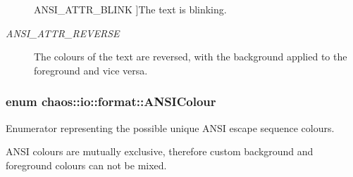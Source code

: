 \begin{Desc}
\begin{description}
{\hypertarget{namespacechaos_1_1io_1_1format_af01119682ec0bc616b49641e0c2a7ccfacd3671458d96396a0fec66c993244186}{A\-N\-S\-I\-\_\-\-A\-T\-T\-R\-\_\-\-B\-L\-I\-N\-K}\label{namespacechaos_1_1io_1_1format_af01119682ec0bc616b49641e0c2a7ccfacd3671458d96396a0fec66c993244186}
}]The text is blinking. \item[{\em 
\hypertarget{namespacechaos_1_1io_1_1format_af01119682ec0bc616b49641e0c2a7ccfaa7b58f4c0365d47d2bc98a4587521806}{A\-N\-S\-I\-\_\-\-A\-T\-T\-R\-\_\-\-R\-E\-V\-E\-R\-S\-E}\label{namespacechaos_1_1io_1_1format_af01119682ec0bc616b49641e0c2a7ccfaa7b58f4c0365d47d2bc98a4587521806}
}]The colours of the text are reversed, with the background applied to the foreground and vice versa. \end{description}
\end{Desc}
\hypertarget{namespacechaos_1_1io_1_1format_aa30dcff2478ffc94e33504c8886a5b1a}{
\subsubsection[{A\-N\-S\-I\-Colour}]{\setlength{\rightskip}{0pt plus 5cm}enum {\bf chaos\-::io\-::format\-::\-A\-N\-S\-I\-Colour}}}\label{namespacechaos_1_1io_1_1format_aa30dcff2478ffc94e33504c8886a5b1a}


Enumerator representing the possible unique A\-N\-S\-I escape sequence colours. 

A\-N\-S\-I colours are mutually exclusive, therefore custom background and foreground colours can not be mixed. 

